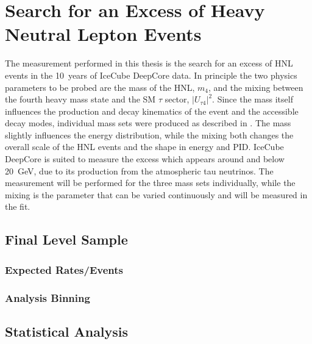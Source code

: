 \setchapterpreamble[u]{\margintoc}

\chapter{Search for an Excess of Heavy Neutral Lepton Events}

The measurement performed in this thesis is the search for an excess of HNL events in the \SI{10}{years} of IceCube DeepCore data. In principle the two physics parameters to be probed are the mass of the HNL, $m_4$, and the mixing between the fourth heavy mass state and the SM $\tau$ sector, $|U_{\tau4}|^2$. Since the mass itself influences the production and decay kinematics of the event and the accessible decay modes, individual mass sets were produced as described in . The mass slightly influences the energy distribution, while the mixing both changes the overall scale of the HNL events and the shape in energy and PID. IceCube DeepCore is suited to measure the excess which appears around and below \SI{20}{\giga\electronvolt}, due to its production from the atmospheric tau neutrinos. The measurement will be performed for the three mass sets individually, while the mixing is the parameter that can be varied continuously and will be measured in the fit. 


\section{Final Level Sample} 

\subsection{Expected Rates/Events}


\subsection{Analysis Binning}






\section{Statistical Analysis} 


